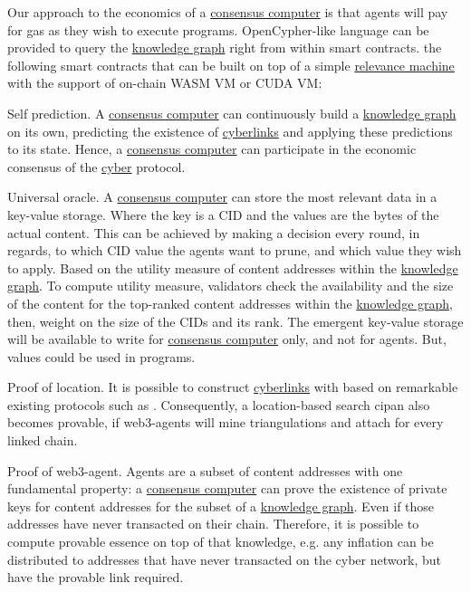 \documentclass[8pt,oneside]{amsart}
\newcommand{\linkgreen}[2]{\href{#1}{\color{green}{#2}}}
\begin{document}
Our approach to the economics of a {\hyperref[consensus-computer]{consensus computer}} is that agents will pay for gas as they wish to execute programs. OpenCypher-like language can be provided to query the {\hyperref[knowledge-graph]{knowledge graph}} right from within smart contracts. \linkgreen{https://medium.com/@karpathy/software-2-0-a64152b37c35}{We can envision} the following smart contracts that can be built on top of a simple {\hyperref[relevance-machine]{relevance machine}} with the support of on-chain WASM VM or CUDA VM:

Self prediction. A {\hyperref[consensus-computer]{consensus computer}} can continuously build a {\hyperref[knowledge-graph]{knowledge graph}} on its own, predicting the existence of {\hyperref[cyberlinks]{cyberlinks}} and applying these predictions to its state. Hence, a {\hyperref[consensus-computer]{consensus computer}} can participate in the economic consensus of the {\hyperref[cyber]{cyber}} protocol.

Universal oracle. A {\hyperref[consensus-computer]{consensus computer}} can store the most relevant data in a key-value storage. Where the key is a CID and the values are the bytes of the actual content. This can be achieved by making a decision every round, in regards, to which CID value the agents want to prune, and which value they wish to apply. Based on the utility measure of content addresses within the {\hyperref[knowledge-graph]{knowledge graph}}. To compute utility measure, validators check the availability and the size of the content for the top-ranked content addresses within the {\hyperref[knowledge-graph]{knowledge graph}}, then, weight on the size of the CIDs and its rank. The emergent key-value storage will be available to write for {\hyperref[consensus-computer]{consensus computer}} only, and not for agents. But, values could be used in programs.

Proof of location. It is possible to construct {\hyperref[cyberlinks]{cyberlinks}} with \linkgreen{https://ipfs.io/ipfs/QmZYKGuLHf2h1mZrhiP2FzYsjj3tWt2LYduMCRbpgi5pKG}{Proof-of-Location} based on remarkable existing protocols such as \linkgreen{https://ipfs.io/ipfs/QmZYKGuLHf2h1mZrhiP2FzYsjj3tWt2LYduMCRbpgi5pKG}{FOAM}. Consequently, a location-based search cipan also becomes provable, if web3-agents will mine triangulations and attach \linkgreen{https://ipfs.io/ipfs/QmZYKGuLHf2h1mZrhiP2FzYsjj3tWt2LYduMCRbpgi5pKG}{proof-of-location} for every linked chain.

Proof of web3-agent. Agents are a subset of content addresses with one fundamental property: a {\hyperref[consensus-computer]{consensus computer}} can prove the existence of private keys for content addresses for the subset of a {\hyperref[knowledge-graph]{knowledge graph}}. Even if those addresses have never transacted on their chain. Therefore, it is possible to compute provable essence on top of that knowledge, e.g. any inflation can be distributed to addresses that have never transacted on the cyber network, but have the provable link required.
\end{document}
